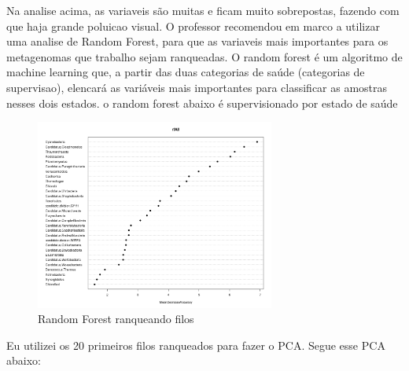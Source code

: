 \documentclass[12pt, a4paper]{report}
\begin{document}
Na analise acima, as variaveis são muitas e ficam muito sobrepostas, fazendo com que haja grande poluicao visual. O professor recomendou em marco a utilizar uma analise de Random Forest, para que as variaveis mais importantes para os metagenomas que trabalho sejam ranqueadas. O random forest é um algoritmo de machine learning que, a partir das duas categorias de saúde (categorias de supervisao), elencará as variáveis mais importantes para classificar as amostras nesses dois estados. o random forest abaixo é supervisionado por estado de saúde \\

\begin{figure}[!h]
  \centering 
  \includegraphics[width=0.7\textwidth]{figures/randomforest_taxonomic_corais_2018_10_01.jpeg}
  \caption{Random Forest ranqueando filos}
  \end{figure}

Eu utilizei os 20 primeiros filos ranqueados para fazer o PCA. Segue esse PCA abaixo:
\end{document}
